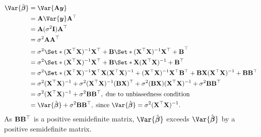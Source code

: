 \begin{align*}
    \Var{\tilde{\Vector{\beta}}}
     & =\Var{\Matrix{A}\Vector{y}}                                                                                                                                                                                        \\
     & =\Matrix{A}\Var{\Vector{y}}\Matrix{A}^\top                                                                                                                                                                         \\
     & =\Matrix{A}(\sigma^2 \Matrix{I})\Matrix{A}^\top                                                                                                                                                                    \\
     & =\sigma^2 \Matrix{A}\Matrix{A}^\top                                                                                                                                                                                \\
     & =\sigma^2\Set*{(\Matrix{X}^\top \Matrix{X})^{-1}\Matrix{X}^\top + \Matrix{B}}\Set*{(\Matrix{X}^\top \Matrix{X})^{-1}\Matrix{X}^\top + \Matrix{B}}^\top                                                             \\
     & =\sigma^2\Set*{(\Matrix{X}^\top \Matrix{X})^{-1}\Matrix{X}^\top + \Matrix{B}}\Set*{\Matrix{X}(\Matrix{X}^\top \Matrix{X})^{-1} + \Matrix{B}^\top}                                                                  \\
     & =\sigma^2\Set*{(\Matrix{X}^\top \Matrix{X})^{-1}\Matrix{X}^\top \Matrix{X}(\Matrix{X}^\top \Matrix{X})^{-1}+(\Matrix{X}^\top \Matrix{X})^{-1}\Matrix{X}^\top \Matrix{B}^\top+
    \Matrix{B}\Matrix{X}(\Matrix{X}^\top \Matrix{X})^{-1}+\Matrix{B}\Matrix{B}^\top}                                                                                                                                      \\
     & =\sigma^2(\Matrix{X}^\top \Matrix{X})^{-1}+\sigma^2(\Matrix{X}^\top \Matrix{X})^{-1}(\Matrix{B}\Matrix{X})^\top+\sigma^2(\Matrix{B}\Matrix{X})(\Matrix{X}^\top \Matrix{X})^{-1}+\sigma^2 \Matrix{B}\Matrix{B}^\top \\
     & =\sigma^2(\Matrix{X}^\top \Matrix{X})^{-1}+\sigma^2 \Matrix{B}\Matrix{B}^\top,\;\text{due to unbiasedness condition}                                                                                               \\
     & =\Var{\hat{\Vector{\beta}}}+\sigma^2 \Matrix{B}\Matrix{B}^\top,\;\text{since $ \Var{\hat{\Vector{\beta}}}=\sigma^2(\Matrix{X}^\top \Matrix{X})^{-1} $}.
\end{align*}
As $ \mathbf{B}\mathbf{B}^\top $ is a positive semidefinite matrix,
$ \Var{\tilde{\Vector{\beta}}} $ exceeds $ \Var{\hat{\Vector{\beta}}} $
by a positive semidefinite matrix.

